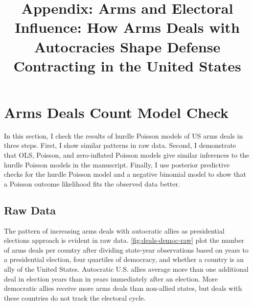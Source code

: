 \documentclass[12pt]{article}
\title{\textbf{Appendix: Arms and Electoral Influence: How Arms Deals with Autocracies Shape Defense Contracting in the United States}}
\date{}
\begin{document}
\maketitle 

\singlespace 

\tableofcontents

\bigskip





\section{Arms Deals Count Model Check}

In this section, I check the results of hurdle Poisson models of US arms deals in three steps. 
First, I show similar patterns in raw data. 
Second, I demonstrate that OLS, Poisson, and zero-inflated Poisson models give similar inferences to the hurdle Poisson models in the manuscript. 
Finally, I use posterior predictive checks for the hurdle Poisson model and a negative binomial model to show that a Poisson outcome likelihood fits the observed data better. 


\subsection{Raw Data}

The pattern of increasing arms deals with autocratic allies as presidential elections approach is evident in raw data.
\autoref{fig:deals-democ-raw} plot the number of arms deals per country after dividing state-year observations based on years to a presidential election, four quartiles of democracy, and whether a country is an ally of the United States.
Autocratic U.S. allies average more than one additional deal in election years than in years immediately after an election. 
More democratic allies receive more arms deals than non-allied states, but deals with these countries do not track the electoral cycle. 
\end{document}

